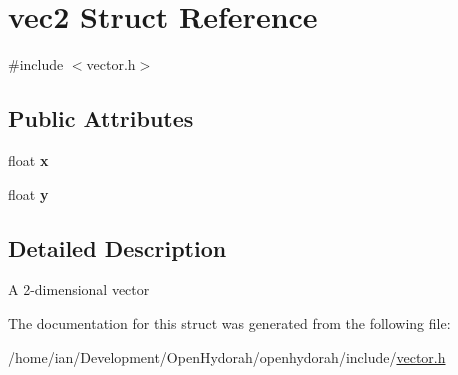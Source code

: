 \hypertarget{structvec2}{\section{vec2 Struct Reference}
\label{structvec2}
}


{\ttfamily \#include $<$vector.\-h$>$}

\subsection*{Public Attributes}
\begin{DoxyCompactItemize}
\item 
\hypertarget{structvec2_a002d3519d48fe3cd79729b5b0ded74bf}{float {\bfseries x}}\label{structvec2_a002d3519d48fe3cd79729b5b0ded74bf}

\item 
\hypertarget{structvec2_a6d28b12b511da692550fc9d37b4e9b1d}{float {\bfseries y}}\label{structvec2_a6d28b12b511da692550fc9d37b4e9b1d}

\end{DoxyCompactItemize}


\subsection{Detailed Description}
A 2-\/dimensional vector 

The documentation for this struct was generated from the following file\-:\begin{DoxyCompactItemize}
\item 
/home/ian/\-Development/\-Open\-Hydorah/openhydorah/include/\hyperlink{vector_8h}{vector.\-h}\end{DoxyCompactItemize}
